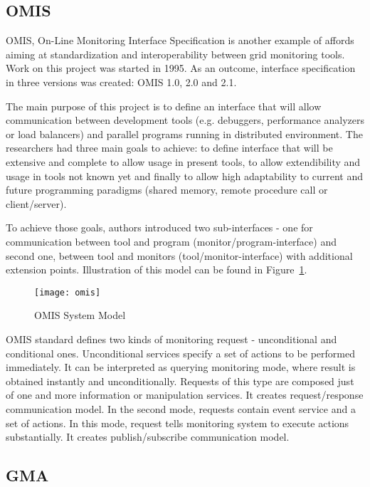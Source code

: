 
\subsection{OMIS}
\label{ssec:omis}

OMIS, On-Line Monitoring Interface Specification is another example of affords aiming at standardization and interoperability between grid monitoring tools. Work on this project was started in 1995. As an outcome, interface specification in three versions was created: OMIS 1.0\cite{OMIS1}, 2.0\cite{OMIS2} and 2.1.

The main purpose of this project is to define an interface that will allow communication between development tools (e.g. debuggers, performance analyzers or load balancers) and parallel programs running in distributed environment. The researchers had three main goals to achieve: to define interface that will be extensive and complete to allow usage in present tools, to allow extendibility and usage in tools not known yet and finally to allow high adaptability to current and future programming paradigms (shared memory, remote procedure call or client/server). 

To achieve those goals, authors introduced two sub-interfaces - one for communication between tool and program (monitor/program-interface) and second one, between tool and monitors (tool/monitor-interface) with additional extension points. Illustration of this model can be found in Figure~\ref{fig:omis}. 

\begin{figure}[ht]
	\centering
	\texttt{[image: omis]}
	\caption{OMIS System Model}
	\label{fig:omis}
\end{figure}

OMIS standard defines two kinds of monitoring request - unconditional and conditional ones. Unconditional services specify a set of actions to be performed immediately. It can be interpreted as querying monitoring mode, where result is obtained instantly and unconditionally. Requests of this type are composed just of one and more information or manipulation services. It creates request/response communication model. In the second mode, requests contain event service and a set of actions. In this mode, request tells monitoring system to execute actions substantially. It creates publish/subscribe communication model.

\subsection{GMA}
\label{ssec:gma}

